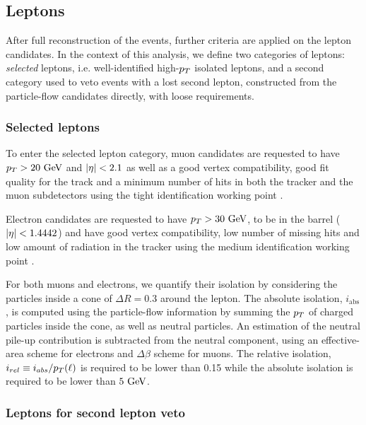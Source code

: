         \subsection{Leptons}

    After full reconstruction of the events, further criteria are applied on the
    lepton candidates. In the context of this analysis, we define two categories
    of leptons: \emph{selected} leptons, i.e. well-identified high-$p_T$
    isolated leptons, and a second category used to veto events with a lost
    second lepton, constructed from the particle-flow candidates directly, with
    loose requirements.

            \subsubsection{Selected leptons}

    To enter the selected lepton category, muon candidates are requested to have
    $p_T > 20~\text{GeV}$ and $\left| \eta \right| < 2.1$ as well as a good vertex compatibility,
    good fit quality for the track and a minimum number of hits in both the
    tracker and the muon subdetectors using the tight identification working
    point \cite{MuonID}.

    Electron candidates are requested to have $p_T > 30~\text{GeV}$, to be in the
    barrel ($\left| \eta \right| < 1.4442$) and have good vertex compatibility, low number
    of missing hits and low amount of radiation in the tracker using the medium
    identification working point \cite{ElectronID}.

    For both muons and electrons, we quantify their isolation by considering the
    particles inside a cone of $\Delta R = 0.3$ around the lepton. The absolute
    isolation, $i_\text{abs}$, is computed using the particle-flow information
    by summing the $p_T$ of charged particles inside the cone, as well as
    neutral particles. An estimation of the neutral pile-up contribution is
    subtracted from the neutral component, using an effective-area scheme for
    electrons and $\Delta \beta$ scheme for muons. The relative isolation,
    $i_{rel} \equiv i_{abs} / p_T(\ell)$ is required to be lower than 0.15
    while the absolute isolation is required to be lower than $5~\text{GeV}$.

        \subsubsection{Leptons for second lepton veto \label{sec:vetoLeptons}}

